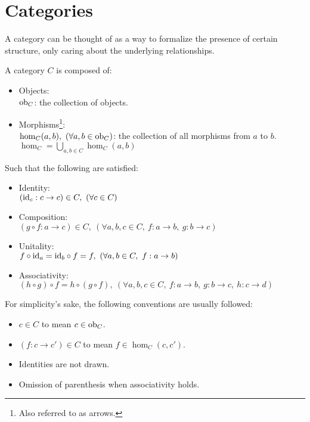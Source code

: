 \section{Categories}
A category can be thought of as a way to formalize the presence of certain
structure, only caring about the underlying relationships.

\begin{definition}[Category]
  A category $C$ is composed of: \parencite{fong_spivak:7sketches}
  \begin{itemize}
    \item Objects:\\
      $\mathrm{ob}_C$: the collection of objects.
    \item Morphisms\footnote{Also referred to as arrows.}:\\
      $\hom_C(a, b),\ (\forall a, b \in \mathrm{ob}_C)$: the collection of all morphisms from $a$ to $b$.\\
      $\hom_C = \bigcup\limits_{a,b\in C} \hom_C(a,b)$
  \end{itemize}

  Such that the following are satisfied:
  \begin{itemize}
    \item Identity:\\
      $(\mathrm{id}_c: c \to c) \in C,\ (\forall c \in C)$
    \item Composition:\\
      $(g \circ f : a \to c) \in C,
        \ (\forall a, b, c \in C,\ f: a \to b,\ g:b \to c)$
    \item Unitality:\\
      $f \circ \mathrm{id}_a = \mathrm{id}_b \circ f = f,
        \ (\forall a, b \in C,\ f: a \to b)$
    \item Associativity:\\
      $(h \circ g) \circ f = h \circ (g \circ f), \ (\forall a,b,c\in C,\ f:a\to
        b,\ g:b\to c,\ h:c\to d)$
  \end{itemize}
\end{definition}

\begin{remark}
  For simplicity's sake, the following conventions are usually followed:
  \begin{itemize}
    \item $c\in C$ to mean $c\in\mathrm{ob}_C$.
    \item $(f: c\to c')\in C$ to mean $f\in \hom_C(c, c')$.
    \item Identities are not drawn.
    \item Omission of parenthesis when associativity holds.
  \end{itemize}
\end{remark}

